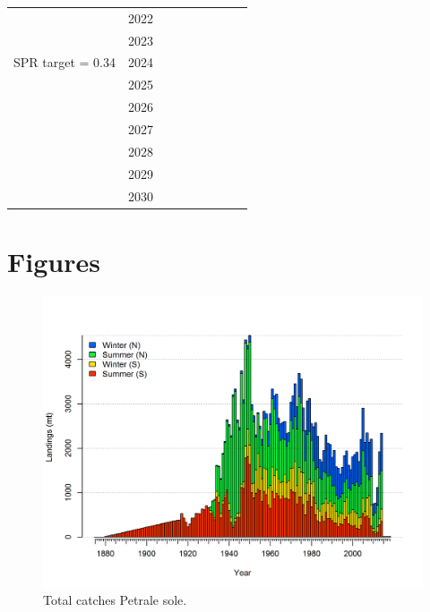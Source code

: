 \documentclass[12pt,]{article}
\begin{document}
\begin{table}[ht]
{\begin{tabular}{l|cc|>{\centering}p{.7in}c|>{\centering}p{.7in}c|>{\centering}p{.7in}c}
   & 2022 &  &  &  &  &  &  &  \\ 
   & 2023 &  &  &  &  &  &  &  \\ 
  SPR target = 0.34 & 2024 &  &  &  &  &  &  &  \\ 
   & 2025 &  &  &  &  &  &  &  \\ 
   & 2026 &  &  &  &  &  &  &  \\ 
   & 2027 &  &  &  &  &  &  &  \\ 
   & 2028 &  &  &  &  &  &  &  \\ 
   & 2029 &  &  &  &  &  &  &  \\ 
   & 2030 &  &  &  &  &  &  &  \\ 
   \hline
\end{tabular}
}
\end{table}

\clearpage

\section{Figures}\label{figures}

\FloatBarrier

\begin{figure}
\centering
\includegraphics{r4ss/plots_mod1/catch2 landings stacked.png}
\caption{Total catches Petrale sole. \label{fig:Catch}}
\end{figure}

\FloatBarrier
\end{document}
